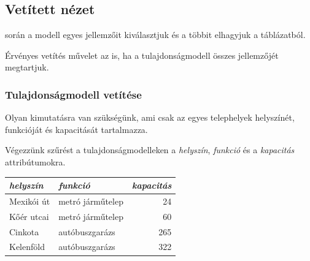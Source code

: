 \subsection{Vetített nézet}

\begin{definicio}
	 során a modell egyes jellemzőit kiválasztjuk és a többit elhagyjuk a táblázatból.

\begin{megjegyzes}
	Érvényes vetítés művelet az is, ha a tulajdonságmodell összes jellemzőjét megtartjuk.
\end{megjegyzes}
\end{definicio}

\subsubsection{Tulajdonságmodell vetítése}

\begin{pelda}
	Olyan kimutatásra van szükségünk, ami csak az egyes telephelyek helyszínét, funkcióját és kapacitását tartalmazza.
\end{pelda}

Végezzünk szűrést a tulajdonságmodelleken a \textit{helyszín}, \textit{funkció} és a \textit{kapacitás} attribútumokra.

\begin{table}[H]
	\sf
	\centering
	\begin{tabular}{llr}
		\toprule
		\it helyszín & \it funkció      & \it kapacitás \\ \midrule
		Mexikói út   & metró járműtelep &            24 \\
		Kőér utcai   & metró járműtelep &            60 \\
		Cinkota      & autóbuszgarázs   &           265 \\
		Kelenföld    & autóbuszgarázs   &           322 \\ \bottomrule
	\end{tabular}
\end{table}

%
%
%

